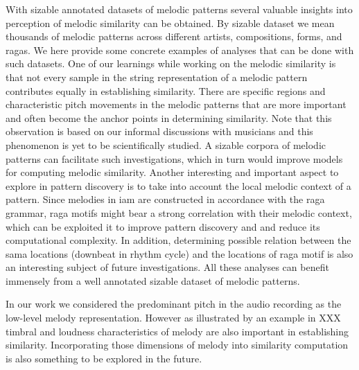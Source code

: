 With sizable annotated datasets of melodic patterns several valuable insights into perception of melodic similarity can be obtained. By sizable dataset we mean thousands of melodic patterns across different artists, compositions, forms, and \glspl{raga}. We here provide some concrete examples of analyses that can be done with such datasets. One of our learnings while working on the melodic similarity is that not every sample in the string representation of a melodic pattern contributes equally in establishing similarity. There are specific regions and characteristic pitch movements in the melodic patterns that are more important and often become the anchor points in determining similarity. Note that this observation is based on our informal discussions with musicians and this phenomenon is yet to be scientifically studied. A sizable corpora of melodic patterns can facilitate such investigations, which in turn would improve models for computing melodic similarity. Another interesting and important aspect to explore in pattern discovery is to take into account the local melodic context of a pattern. Since melodies in \gls{iam} are constructed in accordance with the \gls{raga} grammar, \gls{raga} motifs might bear a strong correlation with their melodic context, which can be exploited it to improve pattern discovery and and reduce its computational complexity. In addition, determining possible relation between the \gls{sama} locations (downbeat in rhythm cycle) and the locations of \gls{raga} motif is also an interesting subject of future investigations. All these analyses can benefit immensely from a well annotated sizable dataset of melodic patterns. 

In our work we considered the predominant pitch in the audio recording as the low-level melody representation. However as illustrated by an example in  XXX timbral and loudness characteristics of melody are also important in establishing similarity. Incorporating those dimensions of melody into similarity computation is also something to be explored in the future.

